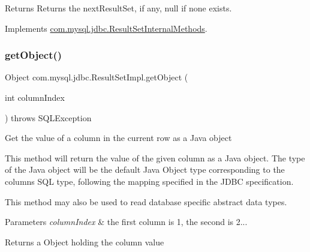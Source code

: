 \begin{DoxyReturn}{Returns}
Returns the next\+Result\+Set, if any, null if none exists. 
\end{DoxyReturn}


Implements \mbox{\hyperlink{interfacecom_1_1mysql_1_1jdbc_1_1_result_set_internal_methods_a6e4a07c50830687cccf98fb12bdd3e37}{com.\+mysql.\+jdbc.\+Result\+Set\+Internal\+Methods}}.

\mbox{\label{classcom_1_1mysql_1_1jdbc_1_1_result_set_impl_ac61c9d2a780132e736f4acbdb25da396}} 
\subsubsection{\texorpdfstring{get\+Object()}{getObject()}\hspace{0.1cm}{\footnotesize\ttfamily [1/4]}}
{\footnotesize\ttfamily Object com.\+mysql.\+jdbc.\+Result\+Set\+Impl.\+get\+Object (\begin{DoxyParamCaption}\item[{int}]{column\+Index }\end{DoxyParamCaption}) throws S\+Q\+L\+Exception}

Get the value of a column in the current row as a Java object

This method will return the value of the given column as a Java object. The type of the Java object will be the default Java Object type corresponding to the column\textquotesingle{}s S\+QL type, following the mapping specified in the J\+D\+BC specification. 

This method may also be used to read database specific abstract data types. 


\begin{DoxyParams}{Parameters}
{\em column\+Index} & the first column is 1, the second is 2...\\
\hline
\end{DoxyParams}
\begin{DoxyReturn}{Returns}
a Object holding the column value
\end{DoxyReturn}

